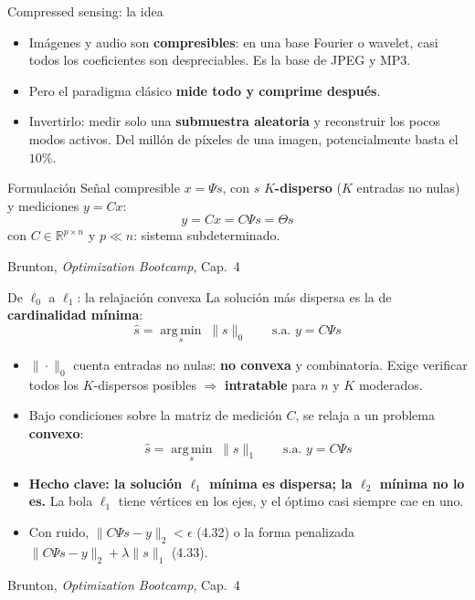 \documentclass[10pt,aspectratio=169]{beamer}
\newcommand{\fuente}{\vfill{\scriptsize\color{gray}Brunton, \emph{Optimization Bootcamp}, Cap.~4}}
\newcommand{\R}{\mathbb{R}}
\newcommand{\argmin}{\operatorname*{arg\,min}}
\begin{document}
\begin{frame}{Compressed sensing: la idea}
  \small
  \begin{itemize}
    \item Imágenes y audio son \textbf{compresibles}: en una base Fourier o
      wavelet, casi todos los coeficientes son despreciables. Es la base de
      JPEG y MP3.
    \item Pero el paradigma clásico \textbf{mide todo y comprime después}.
    \item Invertirlo: medir solo una \textbf{submuestra aleatoria} y reconstruir
      los pocos modos activos. Del millón de píxeles de una imagen,
      potencialmente basta el $10\%$.
  \end{itemize}

  \vspace{1mm}
  \begin{block}{Formulación}
    Señal compresible $x = \Psi s$, con $s$ \textbf{$K$-disperso}
    ($K$ entradas no nulas) y mediciones $y = Cx$:
    \[
      y = Cx = C\Psi s = \Theta s \tag{4.29}
    \]
    con $C \in \R^{p\times n}$ y $p \ll n$: sistema subdeterminado.
  \end{block}
  \fuente
\end{frame}

\begin{frame}{De $\ell_0$ a $\ell_1$: la relajación convexa}
  \small
  La solución más dispersa es la de \textbf{cardinalidad mínima}:
  \[
    \hat{s} = \argmin_s \; \|s\|_0
    \qquad \text{s.a. } y = C\Psi s \tag{4.30}
  \]
  \begin{itemize}
    \item $\|\cdot\|_0$ cuenta entradas no nulas: \textbf{no convexa} y
      combinatoria. Exige verificar todos los $K$-dispersos posibles
      $\Rightarrow$ \textbf{intratable} para $n$ y $K$ moderados.
    \item Bajo condiciones sobre la matriz de medición $C$, se relaja a un
      problema \textbf{convexo}:
      \[
        \hat{s} = \argmin_s \; \|s\|_1
        \qquad \text{s.a. } y = C\Psi s \tag{4.31}
      \]
    \item \textbf{Hecho clave: la solución $\ell_1$ mínima es dispersa; la
      $\ell_2$ mínima no lo es.} La bola $\ell_1$ tiene vértices en los ejes,
      y el óptimo casi siempre cae en uno.
    \item Con ruido, $\|C\Psi s - y\|_2 < \epsilon$ (4.32) o la forma
      penalizada $\|C\Psi s-y\|_2 + \lambda\|s\|_1$ (4.33).
  \end{itemize}
  \fuente
\end{frame}
\end{document}
